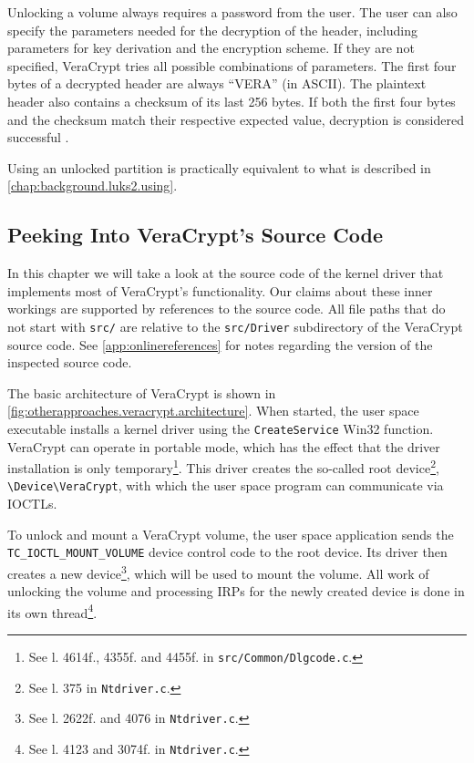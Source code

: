 Unlocking a volume always requires a password from the user. The user can also specify the parameters needed for the decryption of the header, including parameters for key derivation and the encryption scheme. If they are not specified, VeraCrypt tries all possible combinations of parameters. The first four bytes of a decrypted header are always ``VERA'' (in ASCII). The plaintext header also contains a checksum of its last 256 bytes. If both the first four bytes and the checksum match their respective expected value, decryption is considered successful \cite{Veracrypt}.

Using an unlocked partition is practically equivalent to what is described in \autoref{chap:background.luks2.using}.

\subsection{Peeking Into VeraCrypt's Source Code}
\label{chap:otherapproaches.veracrypt.peeking}
In this chapter we will take a look at the source code of the kernel driver that implements most of VeraCrypt's functionality. Our claims about these inner workings are supported by references to the source code. All file paths that do not start with \texttt{src/} are relative to the \texttt{src/Driver} subdirectory of the VeraCrypt source code. See \autoref{app:onlinereferences} for notes regarding the version of the inspected source code.

The basic architecture of VeraCrypt is shown in \autoref{fig:otherapproaches.veracrypt.architecture}. When started, the user space executable installs a kernel driver using the \texttt{CreateService} Win32 function. VeraCrypt can operate in portable mode, which has the effect that the driver installation is only temporary\footnote{\label{fn:otherapproaches.veracrypt.createservice} See l. 4614f., 4355f. and 4455f. in \texttt{src/Common/Dlgcode.c}.}. This driver creates the so-called root device\footnote{\label{fn:otherapproaches.veracrypt.createroot} See l. 375 in \texttt{Ntdriver.c}.}, \texttt{\textbackslash Device\textbackslash VeraCrypt}, with which the user space program can communicate via IOCTLs.

To unlock and mount a VeraCrypt volume, the user space application sends the \texttt{TC\_IOCTL\_MOUNT\_VOLUME} device control code to the root device. Its driver then creates a new device\footnote{\label{fn:otherapproaches.veracrypt.createdevice} See l. 2622f. and 4076 in \texttt{Ntdriver.c}.}, which will be used to mount the volume. All work of unlocking the volume and processing IRPs for the newly created device is done in its own thread\footnote{\label{fn:otherapproaches.veracrypt.volumethread} See l. 4123 and 3074f. in \texttt{Ntdriver.c}.}.

